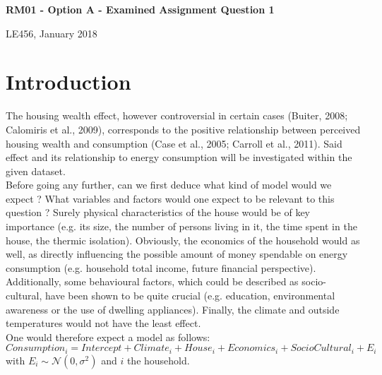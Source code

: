 \documentclass[12pt]{article}
\begin{document}
\makeatletter
\thispagestyle{empty}
	\begin{center}
		\vspace*{-1cm}
		\noindent\hrulefill
		\vspace{0.5cm}
		
		\begin{minipage}[c]{0.7\textwidth}
			\bf\Large\centering
			RM01 - Option A - Examined Assignment Question 1\end{minipage}

		\vspace{0.5cm}
		\noindent\hrulefill	
		\vspace{0.5cm}
		
		{
			LE456, January 2018
			\vspace{0.5cm}			
		}
	\end{center}
\makeatother

\section{Introduction}

The housing wealth effect, however controversial in certain cases (Buiter, 2008; Calomiris et al., 2009), corresponds to the positive relationship between perceived housing wealth and consumption (Case et al., 2005; Carroll et al., 2011). Said effect and its relationship to energy consumption will be investigated within the given dataset.\\

Before going any further, can we first deduce what kind of model would we expect ? What variables and factors would one expect to be relevant to this question ? Surely physical characteristics of the house would be of key importance (e.g. its size, the number of persons living in it, the time spent in the house, the thermic isolation). Obviously, the economics of the household would as well, as directly influencing the possible amount of money spendable on energy consumption (e.g. household total income, future financial perspective). Additionally, some behavioural factors, which could be described as socio-cultural, have been shown to be quite crucial (e.g. education, environmental awareness or the use of dwelling appliances). Finally, the climate and outside temperatures would not have the least effect. \\

One would therefore expect a model as follows:\\

$Consumption_{i} = Intercept + Climate_i + House_i + Economics_i + SocioCultural_i + E_{i}$ with $ E_{i} \sim \mathcal{N}(0,\sigma^2)$ and $i$ the household.\\
\end{document}
